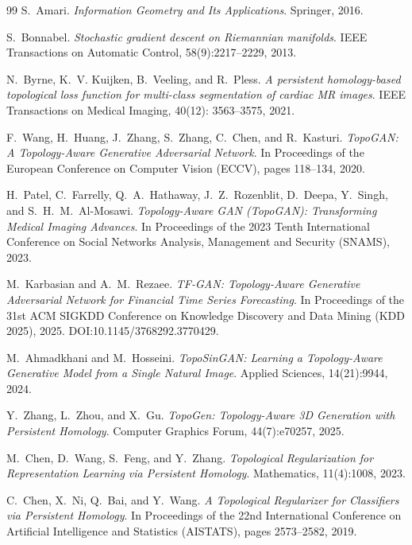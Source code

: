 \documentclass[10pt,leqno]{amsart}
\begin{document}
\begin{thebibliography}{99}
S.~Amari.
\textit{Information Geometry and Its Applications}.
Springer, 2016.

S.~Bonnabel.
\textit{Stochastic gradient descent on Riemannian manifolds}.
IEEE Transactions on Automatic Control, 58(9):2217--2229, 2013.

N.~Byrne, K.~V. Kuijken, B.~Veeling, and R.~Pless.
\textit{A persistent homology-based topological loss function for multi-class segmentation of cardiac MR images}.
IEEE Transactions on Medical Imaging, 40(12): 3563--3575, 2021.

F.~Wang, H.~Huang, J.~Zhang, S.~Zhang, C.~Chen, and R.~Kasturi.
\textit{TopoGAN: A Topology-Aware Generative Adversarial Network}.
In Proceedings of the European Conference on Computer Vision (ECCV), pages 118--134, 2020.

H.~Patel, C.~Farrelly, Q.~A.~Hathaway, J.~Z.~Rozenblit, D.~Deepa, Y.~Singh, and S.~H.~M.~Al-Mosawi.
\textit{Topology-Aware GAN (TopoGAN): Transforming Medical Imaging Advances}.
In Proceedings of the 2023 Tenth International Conference on Social Networks Analysis, Management and Security (SNAMS), 2023.

M.~Karbasian and A.~M.~Rezaee.
\textit{TF-GAN: Topology-Aware Generative Adversarial Network for Financial Time Series Forecasting}.
In Proceedings of the 31st ACM SIGKDD Conference on Knowledge Discovery and Data Mining (KDD 2025), 2025. DOI:10.1145/3768292.3770429.

M.~Ahmadkhani and M.~Hosseini.
\textit{TopoSinGAN: Learning a Topology-Aware Generative Model from a Single Natural Image}.
Applied Sciences, 14(21):9944, 2024.

Y.~Zhang, L.~Zhou, and X.~Gu.
\textit{TopoGen: Topology-Aware 3D Generation with Persistent Homology}.
Computer Graphics Forum, 44(7):e70257, 2025.

M.~Chen, D.~Wang, S.~Feng, and Y.~Zhang.
\textit{Topological Regularization for Representation Learning via Persistent Homology}.
Mathematics, 11(4):1008, 2023.

C.~Chen, X.~Ni, Q.~Bai, and Y.~Wang.
\textit{A Topological Regularizer for Classifiers via Persistent Homology}.
In Proceedings of the 22nd International Conference on Artificial Intelligence and Statistics (AISTATS), pages 2573--2582, 2019.


\end{thebibliography}
\end{document}
